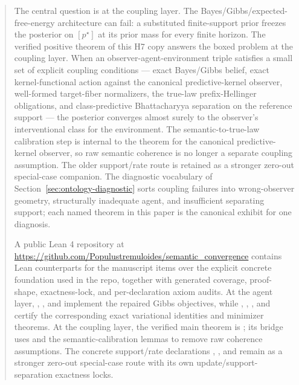 \documentclass[11pt]{article}
\theoremstyle{definition}
\theoremstyle{remark}
\begin{document}
\begin{abstract}
\medskip
\noindent
The central question is at the coupling layer. The Bayes/Gibbs/expected-free-energy architecture can fail: a substituted finite-support prior freezes the posterior on $[p^\star]$ at its prior mass for every finite horizon. The verified positive theorem of this H7 copy answers the boxed problem at the coupling layer. When an observer-agent-environment triple satisfies a small set of explicit coupling conditions --- exact Bayes/Gibbs belief, exact kernel-functional action against the canonical predictive-kernel observer, well-formed target-fiber normalizers, the true-law prefix-Hellinger obligations, and class-predictive Bhattacharyya separation on the reference support --- the posterior converges almost surely to the observer's interventional class for the environment. The semantic-to-true-law calibration step is internal to the theorem for the canonical predictive-kernel observer, so raw semantic coherence is no longer a separate coupling assumption. The older support/rate route is retained as a stronger zero-out special-case companion. The diagnostic vocabulary of Section~\ref{sec:ontology-diagnostic} sorts coupling failures into wrong-observer geometry, structurally inadequate agent, and insufficient separating support; each named theorem in this paper is the canonical exhibit for one diagnosis.

\medskip
\noindent
A public Lean 4 repository at \url{https://github.com/Populustremuloides/semantic_convergence} contains Lean counterparts for the manuscript items over the explicit concrete foundation used in the repo, together with generated coverage, proof-shape, exactness-lock, and per-declaration axiom audits. At the agent layer, , , and  implement the repaired Gibbs objectives, while , , , and  certify the corresponding exact variational identities and minimizer theorems. At the coupling layer, the verified main theorem is ; its bridge uses  and the  semantic-calibration lemmas to remove raw coherence assumptions. The concrete support/rate declarations , , and  remain as a stronger zero-out special-case route with its own update/support-separation exactness locks.
\end{abstract}
\end{document}

